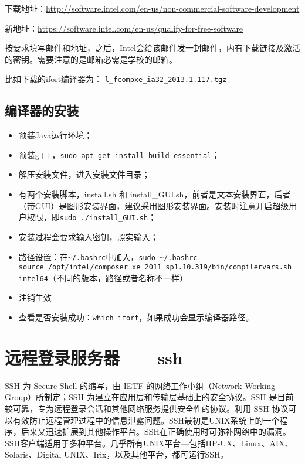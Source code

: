 下载地址：\url{http://software.intel.com/en-us/non-commercial-software-development}

新地址：\url{https://software.intel.com/en-us/qualify-for-free-software}

按要求填写邮件和地址，之后，Intel会给该邮件发一封邮件，内有下载链接及激活的密钥。需要注意的是邮箱必需是学校的邮箱。

比如下载的ifort编译器为：  \verb|l_fcompxe_ia32_2013.1.117.tgz|



\subsection{编译器的安装}
\begin{itemize}
\item 预装Java运行环境；
\item 预装g++，\verb*|sudo apt-get install build-essential|；
\item 解压安装文件，进入安装文件目录；
\item 有两个安装脚本，install.sh 和 install\_GUI.sh，前者是文本安装界面，后者（带GUI）是图形安装界面，建议采用图形安装界面。安装时注意开启超级用户权限，即\verb|sudo ./install_GUI.sh|；
\item 安装过程会要求输入密钥，照实输入；
\item 路径设置：在\verb*|~/.bashrc|中加入，\verb|sudo ~/.bashrc|\\
\verb|source /opt/intel/composer_xe_2011_sp1.10.319/bin/compilervars.sh intel64|（不同的版本，路径或者名称不一样）
\item 注销生效
\item 查看是否安装成功：\verb|which ifort|，如果成功会显示编译器路径。
\end{itemize}






\section{远程登录服务器——ssh}
SSH 为 Secure Shell 的缩写，由 IETF 的网络工作小组（Network Working Group）所制定；SSH 为建立在应用层和传输层基础上的安全协议。SSH 是目前较可靠，专为远程登录会话和其他网络服务提供安全性的协议。利用 SSH 协议可以有效防止远程管理过程中的信息泄露问题。SSH最初是UNIX系统上的一个程序，后来又迅速扩展到其他操作平台。SSH在正确使用时可弥补网络中的漏洞。SSH客户端适用于多种平台。几乎所有UNIX平台—包括HP-UX、Linux、AIX、Solaris、Digital UNIX、Irix，以及其他平台，都可运行SSH。


